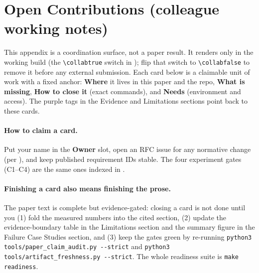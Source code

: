 \ifcollab
\clearpage
\section{Open Contributions (colleague working notes)}
\label{sec:open-contributions}

This appendix is a coordination surface, not a paper result. It renders only in the working
build (the \texttt{\textbackslash collabtrue} switch in ); flip that switch to
\texttt{\textbackslash collabfalse} to remove it before any external submission. Each card below is
a claimable unit of work with a fixed anchor: \textbf{Where} it lives in this paper and the repo,
\textbf{What is missing}, \textbf{How to close it} (exact commands), and \textbf{Needs} (environment
and access). The purple  tags in the Evidence and Limitations sections
point back to these cards.

\paragraph{How to claim a card.} Put your name in the \textbf{Owner} slot, open an RFC issue for any
normative change (per ), and keep published requirement IDs stable. The four
experiment gates (C1--C4) are the same ones indexed in
.

\paragraph{Finishing a card also means finishing the prose.} The paper text is complete but
evidence-gated: closing a card is not done until you (1) fold the measured numbers into the cited
section, (2) update the evidence-boundary table in the Limitations section and the summary figure in
the Failure Case Studies section, and (3) keep the gates green by re-running
\texttt{python3 tools/paper\_claim\_audit.py -{}-strict} and
\texttt{python3 tools/artifact\_freshness.py -{}-strict}. The whole readiness suite is
\texttt{make readiness}.

